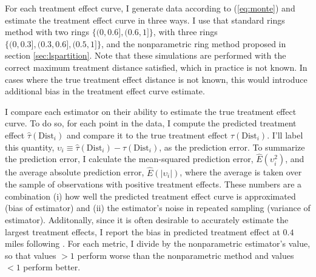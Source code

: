 \documentclass[12pt]{article}
\newcommand{\dist}{\text{Dist}}
\begin{document}
For each treatment effect curve, I generate data according to (\ref{eq:monte}) and estimate the treatment effect curve in three ways. I use that standard rings method with two rings $\{(0, 0.6], (0.6,1] \}$, with three rings $\{(0, 0.3], (0.3, 0.6], (0.5,1] \}$, and the nonparametric ring method proposed in section \ref{sec:lspartition}. Note that these simulations are performed with the correct maximum treatment distance satisfied, which in practice is not known. In cases where the true treatment effect distance is not known, this would introduce additional bias in the treatment effect curve estimate. 

I compare each estimator on their ability to estimate the true treatment effect curve. To do so, for each point in the data, I compute the predicted treatment effect $\hat{\tau}(\dist_i)$ and compare it to the true treatment effect $\tau(\dist_i)$. I'll label this quantity, $\upsilon_i \equiv \hat{\tau}(\dist_i) - \tau(\dist_i)$, as the prediction error. To summarize the prediction error, I calculate the mean-squared prediction error, $\hat{E}(\upsilon_i^2)$, and the average absolute prediction error, $\hat{E}( | \upsilon_i |)$, where the average is taken over the sample of observations with positive treatment effects. These numbers are a combination (i) how well the predicted treatment effect curve is approximated (bias of estimator) and (ii) the estimator's noise in repeated sampling (variance of estimator). Additonally, since it is often desirable to accurately estimate the largest treatment effects, I report the bias in predicted treatment effect at $0.4$ miles following \citet{Diamond_McQuade_2019}. For each metric, I divide by the nonparametric estimator's value, so that values $> 1$ perform worse than the nonparametric method and values $< 1$ perform better.
\end{document}
